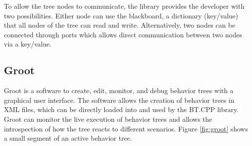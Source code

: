 \begin{table}[ht]
	\centering
	\caption{Decorator Nodes in BT.CPP}
	\label{tab:decorators_bt}
	\renewcommand{\arraystretch}{1.5}
\end{table}

To allow the tree nodes to communicate, the library provides the developer with two possibilities. Either node can use the blackboard, a dictionary (key/value) that all nodes of the tree can read and write. Alternatively, two nodes can be connected through ports which allows direct communication between two nodes via a key/value.

\subsection{Groot}

Groot is a software to create, edit, monitor, and debug behavior trees with a graphical user interface. The software allows the creation of behavior trees in XML files, which can be directly loaded into and used by the BT.CPP library. Groot can monitor the live execution of behavior trees and allows the introspection of how the tree reacts to different scenarios. Figure \ref{fig:groot} shows a small segment of an active behavior tree.

